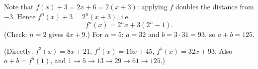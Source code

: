 Note that $f(x)+3=2x+6=2(x+3)$: applying $f$ doubles the distance from $-3$. Hence $f^n(x)+3=2^n(x+3)$, i.e.
\[
f^n(x)=2^nx+3\left(2^n-1\right).
\]
(Check: $n=2$ gives $4x+9$.) For $n=5$: $a=32$ and $b=3\cdot31=93$, so $a+b=\boxed{125}$.

(Directly: $f^3(x)=8x+21$, $f^4(x)=16x+45$, $f^5(x)=32x+93$. Also $a+b=f^5(1)$, and $1\to5\to13\to29\to61\to125$.)
